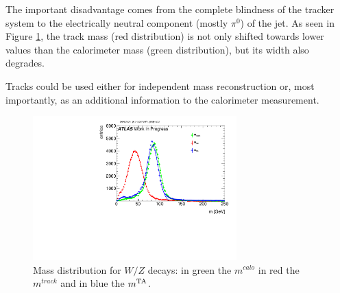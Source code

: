 
The important disadvantage comes from the complete blindness of the tracker system to the 
 electrically neutral component (mostly $\pi^0$) of the jet. As seen in Figure \ref{fig:trackandcalo}, the track mass (red distribution) is not only shifted towards lower values than the calorimeter mass (green distribution), but its width also degrades. 

Tracks could be used either for independent mass reconstruction or, most importantly, as an additional information to the calorimeter measurement.

\begin{figure}[!ht]
  \centering
      \includegraphics[width=0.7\textwidth]{jet_part/1cfrt_h_TrackJets_m.pdf}
  \caption[Mass distribution for $W/Z$ decays]{Mass distribution for $W/Z$ decays: in green the $m^{calo}$ in red the $m^{track}$ and in blue the $m^\textrm{TA}$. }
  \label{fig:trackandcalo}
\end{figure}


